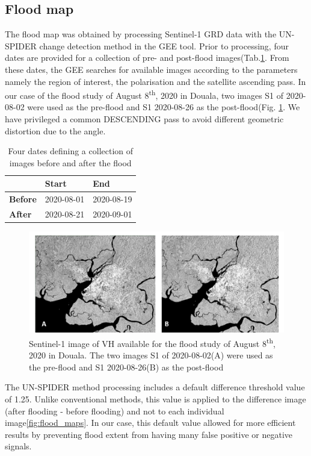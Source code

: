 \subsection{Flood map}
The flood map was obtained by processing Sentinel-1 GRD data with the UN-SPIDER change detection method in the GEE tool. Prior to processing, four dates are provided for a collection of pre- and post-flood images(Tab.\ref{tab:collectionofimage}. From these dates, the GEE searches for available images according to the parameters namely the region of interest, the polarisation and the satellite ascending pass. In our case of the flood study of August  8\textsuperscript{th}, 2020 in Douala, two images S1 of 2020-08-02 were used as the pre-flood and S1 2020-08-26 as the post-flood(Fig. \ref{fig:pre_post_flood}. We have privileged a common DESCENDING pass to avoid different geometric distortion due to the angle.
\begin{table}[hbt!]\centering
\caption{Four dates defining a collection of images before and after the flood}
\begin{tabular}{lll}
\hline
\textbf{}       & \textbf{Start} & \textbf{End} \\
\hline
\textbf{Before} & 2020-08-01     & 2020-08-19   \\
\textbf{After}  & 2020-08-21     & 2020-09-01  \\
\hline
\end{tabular}\label{tab:collectionofimage}
\end{table}

\begin{figure} %
	\centering
	\includegraphics[width=5in]{figure/changedetection.png}
	\caption{Sentinel-1 image of VH available for the flood study of August  8\textsuperscript{th}, 2020 in Douala. The two images S1 of 2020-08-02(A) were used as the pre-flood and S1 2020-08-26(B) as the post-flood}
	\label{fig:pre_post_flood}
\end{figure}

The UN-SPIDER method processing includes a default difference threshold value of 1.25. Unlike conventional methods, this value is applied to the difference image (after flooding - before flooding) and not to each individual image\ref{fig:flood_maps}. In our case, this default value allowed for more efficient results by preventing flood extent from having many false positive or negative signals. 


